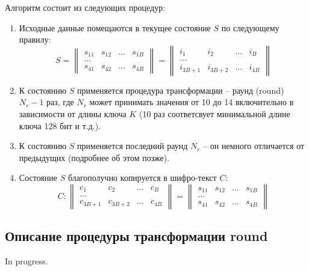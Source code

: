     Алгоритм состоит из следующих процедур:
    \begin{enumerate}
        \item Исходные данные помещаются в текущее состояние $S$ по следующему правилу:
            \begin{equation}
                S =
                \begin{Vmatrix}
                    s_{11} & s_{12} & \dots & s_{1B} \\
                    \dots \\
                    s_{41} & s_{42} & \dots & s_{4B}
                \end{Vmatrix} =
                \begin{Vmatrix}
                    i_{1} & i_{2} & \dots & i_{B} \\
                    \dots \\
                    i_{3B + 1} & i_{3B + 2} & \dots & i_{4B}
                \end{Vmatrix}
            \end{equation}

        \item К состоянию $S$ применяется процедура трансформации -- раунд (round) $N_r - 1$ раз, где $N_r$ может
        принимать значения от 10 до 14 включительно в зависимости от длины ключа $K$
        (10 раз соответсвует минимальной длине ключа 128 бит и т.д.).

        \item К состоянию $S$ применяется последний раунд $N_r$ -- он немного отличается от предыдущих
        (подробнее об этом позже).

        \item Состояние $S$ благополучно копируется в шифро-текст $C$:
        \begin{equation}
            C:
            \begin{Vmatrix}
                c_{1} & c_{2} & \dots & c_{B} \\
                \dots \\
                c_{3B + 1} & c_{3B + 2} & \dots & c_{4B}
            \end{Vmatrix} =
            \begin{Vmatrix}
                s_{11} & s_{12} & \dots & s_{1B} \\
                \dots \\
                s_{41} & s_{42} & \dots & s_{4B}
            \end{Vmatrix}
        \end{equation}
    \end{enumerate}

\subsection{Описание процедуры трансформации round}
    In progress.
